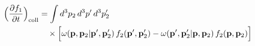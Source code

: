 \documentclass[preview]{standalone}
\begin{document}
\begin{align*}
\special{dvisvgm:raw <g id='unique000'>}\Big(\pdv{f_1}{t}\Big)_{\rm coll}&=\int d^3p_2\,d^3p'\,d^3p_2'\\ &\quad\times\Big[ \special{dvisvgm:raw </g>}\special{dvisvgm:raw <g id='unique001'>}\omega(\va p,\va p_2|\va p',\va p_2')\,f_2(\va p',\va p_2') \special{dvisvgm:raw </g>}\special{dvisvgm:raw <g id='unique002'>}-\omega(\va p',\va p_2'|\va p,\va p_2)\,f_2(\va p,\va p_2) \special{dvisvgm:raw </g>}\special{dvisvgm:raw <g id='unique003'>}\Big]\special{dvisvgm:raw </g>}
\end{align*}
\end{document}
